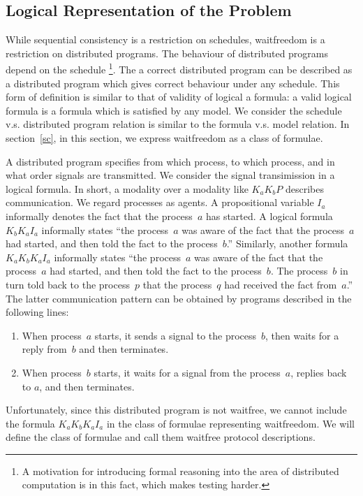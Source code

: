   \subsection{Logical Representation of the Problem}

  While sequential consistency is a restriction on schedules,
  waitfreedom is a restriction on distributed programs.
  The behaviour of distributed programs depend on the schedule%
  \footnote{A motivation for introducing formal reasoning into the area of distributed
  computation is in this fact, which makes testing harder.}.
  The a correct distributed program can be described as
  a distributed program which gives correct behaviour under any schedule.
  This form of definition is similar to that of validity of logical a formula:
  a valid logical formula is a formula which is satisfied by any model.
  We consider the schedule v.s. distributed program relation is similar to
  the formula v.s. model relation.
  In section~\ref{sc},
  in this section, we express waitfreedom as a class of formulae.

  A distributed program specifies
  from which process, to which process, and in what order
  signals are transmitted.
  We consider the signal transimission in a logical formula.
  In short, a modality over a modality like $K_a K_b P$ describes communication.
  We regard processes as agents.
  A propositional variable $I_a$ informally denotes the fact that the process~$a$ has
  started.
  A logical formula $K_b K_a I_a$ informally states
  ``the process~$a$ was aware of the fact that the process~$a$ had started,
  and then told the fact to the process~$b$.''
  Similarly, another formula $K_a K_b K_a I_a$ informally states
  ``the process~$a$ was aware of the fact that the process~$a$ had started,
  and then told the fact to the process~$b$. The process~$b$ in turn told back to the
  process~$p$ that the process~$q$ had received the fact from~$a$.''
  The latter communication pattern can be obtained by programs described in the following lines:
  \begin{enumerate}
   \item When process~$a$ starts, it sends a signal to the process~$b$, then waits for a
	 reply from~$b$ and then terminates.
   \item When process~$b$ starts, it waits for a signal from the process~$a$,
	 replies back to $a$, and then terminates.
  \end{enumerate}
  Unfortunately,
  since this distributed program is not waitfree,
  we cannot include the formula
  $K_a K_b K_a I_a$
  in the class of formulae representing waitfreedom.
  We will define the class of formulae and call them waitfree protocol descriptions.

